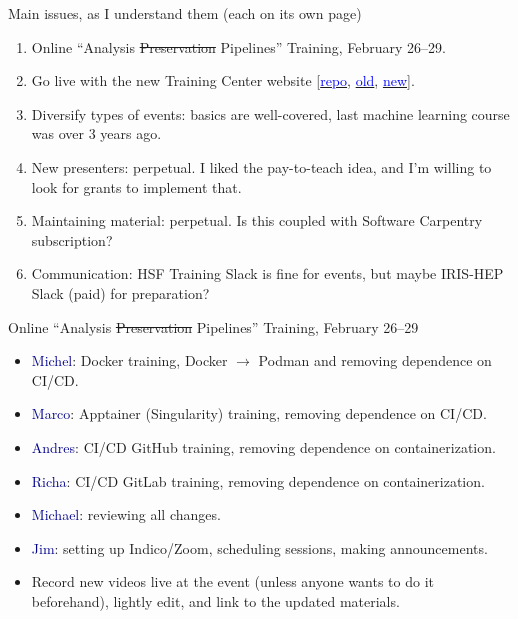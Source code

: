 \documentclass[aspectratio=169]{beamer}
\begin{document}
\begin{frame}{Main issues, as I understand them (each on its own page)}
\large
\vspace{0.5 cm}
\begin{enumerate}\setlength{\itemsep}{0.2 cm}
\item Online ``Analysis \sout{Preservation} Pipelines'' Training, February 26--29.
\item Go live with the new Training Center website [\href{https://github.com/hsf-training/training-center}{\textcolor{blue}{repo}}, \href{https://hepsoftwarefoundation.org/training/center.html}{\textcolor{blue}{old}}, \href{https://main--nimble-pothos-1ee962.netlify.app/}{\textcolor{blue}{new}}].
\item Diversify types of events: basics are well-covered, last machine learning course was over 3 years ago.
\item New presenters: perpetual. I liked the pay-to-teach idea, and I'm willing to look for grants to implement that.
\item Maintaining material: perpetual. Is this coupled with Software Carpentry subscription?
\item Communication: HSF Training Slack is fine for events, but maybe IRIS-HEP Slack (paid) for preparation?
\end{enumerate}
\end{frame}

\begin{frame}{Online ``Analysis \sout{Preservation} Pipelines'' Training, February 26--29}
\vspace{0.5 cm}
\begin{itemize}\setlength{\itemsep}{0.2 cm}
\item \textcolor{darkblue}{Michel}: Docker training, Docker $\to$ Podman and removing dependence on CI/CD.
\item \textcolor{darkblue}{Marco}: Apptainer (Singularity) training, removing dependence on CI/CD.
\item \textcolor{darkblue}{Andres}: CI/CD GitHub training, removing dependence on containerization.
\item \textcolor{darkblue}{Richa}: CI/CD GitLab training, removing dependence on containerization.
\item \textcolor{darkblue}{Michael}: reviewing all changes.
\item \textcolor{darkblue}{Jim}: setting up Indico/Zoom, scheduling sessions, making announcements.
\item Record new videos live at the event (unless anyone wants to do it beforehand), lightly edit, and link to the updated materials.
\end{itemize}
\end{frame}
\end{document}
